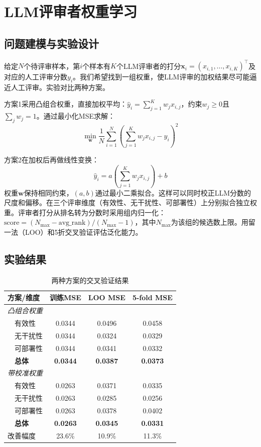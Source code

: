 \section{LLM评审者权重学习}

\subsection{问题建模与实验设计}

给定$N$个待评审样本，第$i$个样本有$K$个LLM评审者的打分$\mathbf{x}_i = (x_{i,1}, \ldots, x_{i,K})^\top$及对应的人工评审分数$y_i$。我们希望找到一组权重，使LLM评审的加权结果尽可能逼近人工评审。实验对比两种方案。

方案1采用凸组合权重，直接加权平均：$\hat{y}_i = \sum_{j=1}^{K} w_j x_{i,j}$，约束$w_j \geq 0$且$\sum_j w_j = 1$。通过最小化MSE求解：
\begin{equation}
\min_{\mathbf{w}} \frac{1}{N} \sum_{i=1}^{N} \left( \sum_{j=1}^{K} w_j x_{i,j} - y_i \right)^2
\end{equation}

方案2在加权后再做线性变换：
\begin{equation}
\hat{y}_i = a \left( \sum_{j=1}^{K} w_j x_{i,j} \right) + b
\end{equation}
权重$\mathbf{w}$保持相同约束，$(a, b)$通过最小二乘拟合。这样可以同时校正LLM分数的尺度和偏移。在三个评审维度（有效性、无干扰性、可部署性）上分别拟合独立权重。评审者打分从排名转为分数时采用组内归一化：$\text{score} = (N_{\text{max}} - \text{avg\_rank}) / (N_{\text{max}} - 1)$，其中$N_{\text{max}}$为该组的候选数上限。用留一法（LOO）和5折交叉验证评估泛化能力。

\subsection{实验结果}

\begin{table}[htbp]
\centering
\caption{两种方案的交叉验证结果}
\label{tab:cv-results}
\begin{tabular}{lccc}
\hline
\textbf{方案/维度} & \textbf{训练MSE} & \textbf{LOO MSE} & \textbf{5-fold MSE} \\
\hline
\multicolumn{4}{l}{\textit{凸组合权重}} \\
~~有效性   & 0.0344 & 0.0496 & 0.0458 \\
~~无干扰性 & 0.0344 & 0.0324 & 0.0329 \\
~~可部署性 & 0.0344 & 0.0341 & 0.0332 \\
~~\textbf{总体} & \textbf{0.0344} & \textbf{0.0387} & \textbf{0.0373} \\
\hline
\multicolumn{4}{l}{\textit{带校准权重}} \\
~~有效性   & 0.0263 & 0.0371 & 0.0335 \\
~~无干扰性 & 0.0263 & 0.0285 & 0.0256 \\
~~可部署性 & 0.0263 & 0.0378 & 0.0402 \\
~~\textbf{总体} & \textbf{0.0263} & \textbf{0.0345} & \textbf{0.0331} \\
\hline
改善幅度 & 23.6\% & 10.9\% & 11.3\% \\
\hline
\end{tabular}
\end{table}


